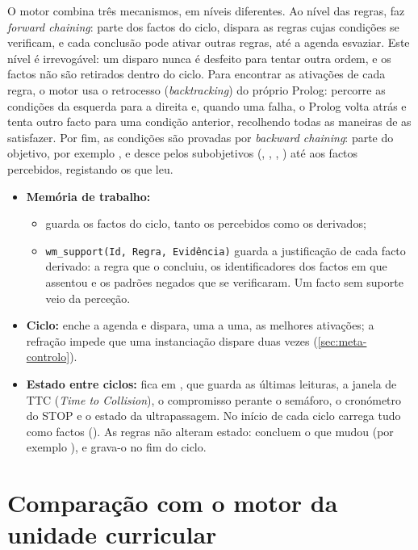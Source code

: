 O motor combina três mecanismos, em níveis diferentes. Ao nível das regras, faz
\emph{forward chaining}: parte dos factos do ciclo, dispara as regras cujas
condições se verificam, e cada conclusão pode ativar outras regras, até a agenda
esvaziar. Este nível é irrevogável: um disparo nunca é desfeito para tentar outra
ordem, e os factos não são retirados dentro do ciclo. Para encontrar as
ativações de cada regra, o motor usa o retrocesso (\emph{backtracking}) do
próprio Prolog:  percorre as condições da esquerda para a direita
e, quando uma falha, o Prolog volta atrás e tenta outro facto para uma condição
anterior, recolhendo todas as maneiras de as satisfazer. Por fim, as condições
 são provadas por \emph{backward chaining}:  parte
do objetivo, por exemplo , e desce pelos
subobjetivos (, , ,
) até aos factos percebidos, registando os que leu.

\begin{itemize}
  \item \textbf{Memória de trabalho:}
  \begin{itemize}
    \item {} guarda os factos do ciclo, tanto os
      percebidos como os derivados;
    \item \texttt{wm\_support(Id, Regra, Evidência)} guarda a justificação de cada
      facto derivado: a regra que o concluiu, os identificadores dos factos em
      que assentou e os padrões negados que se verificaram. Um facto sem
      suporte veio da perceção.
  \end{itemize}
  \item \textbf{Ciclo:}  enche a agenda e dispara, uma a uma, as
    melhores ativações; a refração impede que uma instanciação dispare duas vezes
    (\cref{sec:meta-controlo}).
  \item \textbf{Estado entre ciclos:} fica em , que guarda as
    últimas leituras, a janela de TTC (\emph{Time to Collision}), o compromisso perante o semáforo, o
    cronómetro do STOP e o estado da ultrapassagem. No início de cada ciclo
    carrega tudo como factos (). As regras não alteram
    estado: concluem o que mudou (por exemplo ), e
     grava-o no fim do ciclo.
\end{itemize}

\section{Comparação com o motor da unidade curricular}
\label{sec:comparacao-motor-uc}

